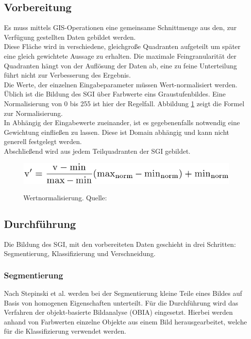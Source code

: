 \documentclass[10pt,conference,compsocconf]{IEEEtran}
\begin{document}
\subsection{Vorbereitung}
 Es muss mittels GIS-Operationen eine gemeinsame Schnittmenge aus den, zur Verfügung gestellten Daten gebildet werden.\\
 Diese Fläche wird in verschiedene, gleichgroße Quadranten aufgeteilt um später eine gleich gewichtete Aussage zu erhalten. Die maximale Feingranularität der Quadranten hängt von der Auflösung der Daten ab, eine zu feine Unterteilung führt nicht zur Verbesserung des Ergebnis.\\
 Die Werte, der einzelnen Eingabeparameter müssen Wert-normalisiert werden. Üblich ist die Bildung des SGI über Farbwerte eins Graustufenbildes. Eine Normalisierung von 0 bis 255 ist hier der Regelfall. Abbildung \ref{img:Wertnormalisierung} zeigt die Formel zur Normalisierung.\\
 In Abhängig der Eingabewerte zueinander, ist es gegebenenfalls notwendig eine Gewichtung einfließen zu lassen. Diese ist Domain abhängig und kann nicht generell festgelegt werden.\\
 Abschließend wird aus jedem Teilquadranten der SGI gebildet.\\
\begin{figure}[H]
	\centering
	\includegraphics[width=1\columnwidth]{img/min_max_normalize.png} \\
	\caption[]{Wertnormalisierung. Quelle: \cite{hagenlocher2014modeling}}
	\label{img:Wertnormalisierung}
\end{figure}

\subsection{Durchführung}
Die Bildung des SGI, mit den vorbereiteten Daten geschieht in drei Schritten: Segmentierung, Klassifizierung und Verschneidung.

\subsubsection{Segmentierung}
Nach Stepinski et al. \cite{stepinski2006automatic} werden bei der Segmentierung kleine Teile eines Bildes auf Basis von homogenen Eigenschaften unterteilt. Für die Durchführung wird das Verfahren der objekt-basierte Bildanalyse (OBIA) \cite{hay2006object} eingesetzt. Hierbei werden anhand von Farbwerten einzelne Objekte aus einem Bild herausgearbeitet, welche für die Klassifizierung verwendet werden.
\end{document}
